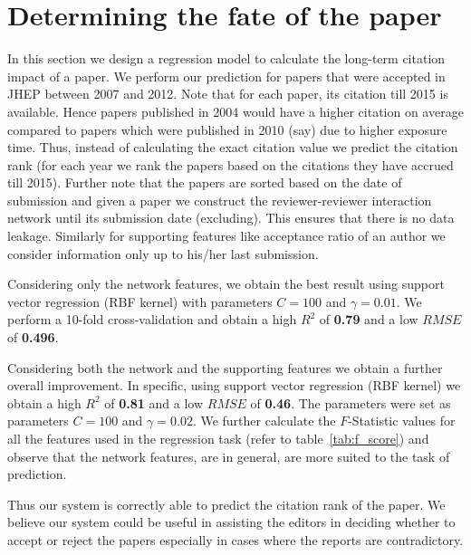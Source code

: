 %

\section{Determining the fate of the paper}
\label{performance_measure}

In this section we design a regression model to calculate the long-term citation impact of a paper. 
We perform our prediction for papers that were accepted in JHEP between 2007 and 2012. Note that for each paper, its citation till 2015 is available. Hence papers published in 2004 would have a higher citation on average compared to papers which were published in 2010 (say) due to higher exposure time. Thus, instead of calculating  the exact citation value we predict the citation rank (for each year we rank the papers based on the citations they have accrued till 2015). Further note that the papers are sorted based on the date of submission and given a paper we construct the reviewer-reviewer interaction network until its submission date (excluding). This ensures that there is no data leakage. Similarly for supporting features like acceptance ratio of an author we consider information only up to his/her last submission. 

 Considering only the network features, we obtain the best result using support vector regression (RBF kernel) with parameters $C=100$ and $\gamma=0.01$. We perform a 10-fold cross-validation and obtain a high $R^2$ of {\bf 0.79} and a low $RMSE$ of {\bf 0.496}. 

 Considering both the network and the supporting features we obtain a further overall improvement. In specific, using support vector regression (RBF kernel) we obtain a high $R^2$ of {\bf 0.81} and a low $RMSE$ of {\bf 0.46}. The parameters were set as parameters $C=100$ and $\gamma=0.02$. We further calculate the $F$-Statistic values for all the features used in the regression task (refer to table~\ref{tab:f_score}) and observe that the network features, are in general, are more suited to the task of prediction.


Thus our system is correctly able to predict the citation rank of the paper. We believe our system could be useful in assisting the editors in deciding whether to accept or reject the papers especially in cases where the reports are contradictory. 

%

